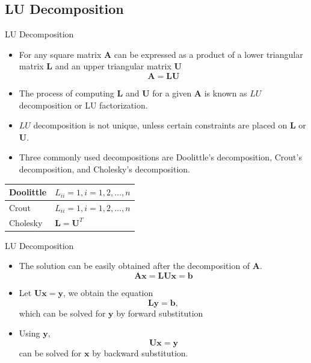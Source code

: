 \documentclass{beamer}
\newcommand{\beforeverb}{\footnotesize}
\newcommand{\afterverb}{\normalsize}
\begin{document}
\subsection[LU Decomposition]{LU Decomposition}
\begin{frame}{LU Decomposition}
\begin{itemize}
\item For any square matrix $\mathbf{A}$ can be expressed as a product of a \alert{lower triangular matrix} $\mathbf{ L}$ and an \alert{upper triangular matrix} $\mathbf{U}$
\[
\mathbf{A}=\mathbf{L}\mathbf{U}
\]
\item  The process of computing $\mathbf{L}$ and $\mathbf{U}$ for a given $\mathbf{A}$ is known as \alert{$LU$ decomposition} or \alert{LU factorization}.
\item $LU$ decomposition is \alert{not} unique, unless certain constraints are placed on $\mathbf{L}$ or $\mathbf{U}$. 
\item Three commonly used decompositions are Doolittle's decomposition, Crout's decomposition, and Cholesky's decomposition.
\end{itemize}
\begin{center}
\beforeverb
\begin{tabular}{|l|l|}
\hline
Doolittle & $L_{ii}=1, i=1,2,\ldots,n$\\
\hline
Crout & $L_{ii}=1, i=1,2,\ldots,n$\\
\hline
Cholesky & $\mathbf{L}=\mathbf{U}^{T}$\\
\hline
\end{tabular}
\afterverb
\end{center}
\end{frame}
\begin{frame}{LU Decomposition}
\begin{itemize}
\item The solution can be easily obtained after the decomposition of $\mathbf{A}$.
\[
\mathbf{Ax}=\mathbf{LUx}=\mathbf{b}
\]
\item Let $\mathbf{Ux}=\mathbf{y}$, we obtain the equation
\[
\mathbf{Ly}=\mathbf{b},
\] 
which can be solved for $\mathbf{y}$ by \alert{forward substitution}
\item  Using $\mathbf{y}$,
\[
\mathbf{Ux}=\mathbf{y}
\]
can be solved for $\mathbf{x}$ by \alert{backward substitution}. 
\end{itemize}
\end{frame}
\end{document}
